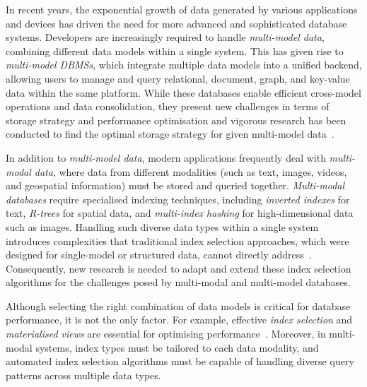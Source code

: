 In recent years, the exponential growth of data generated by various applications and devices has driven the need for more advanced and sophisticated database systems. Developers are increasingly required to handle \textit{multi-model data}, combining different data models within a single system. This has given rise to \textit{multi-model DBMSs}, which integrate multiple data models into a unified backend, allowing users to manage and query relational, document, graph, and key-value data within the same platform. While these databases enable efficient cross-model operations and data consolidation, they present new challenges in terms of storage strategy and performance optimisation and vigorous research has been conducted to find the optimal storage strategy for given multi-model data~\citep{ideas2022vision,MultiSQL,mm_cat_journal,koupil2022mminfer}.

In addition to \textit{multi-model data}, modern applications frequently deal with \textit{multi-modal data}, where data from different modalities (such as text, images, videos, and geospatial information) must be stored and queried together. \textit{Multi-modal databases} require specialised indexing techniques, including \textit{inverted indexes} for text, \textit{R-trees} for spatial data, and \textit{multi-index hashing} for high-dimensional data such as images. Handling such diverse data types within a single system introduces complexities that traditional index selection approaches, which were designed for single-model or structured data, cannot directly address~\citep{DBLP:journals/ijautcomp/LinGGZZL23}. Consequently, new research is needed to adapt and extend these index selection algorithms for the challenges posed by multi-modal and multi-model databases.

Although selecting the right combination of data models is critical for database performance, it is not the only factor. For example, effective \textit{index selection} and \textit{materialised views} are essential for optimising performance~\citep{AI4DB}. Moreover, in multi-modal systems, index types must be tailored to each data modality, and automated index selection algorithms must be capable of handling diverse query patterns across multiple data types. 

